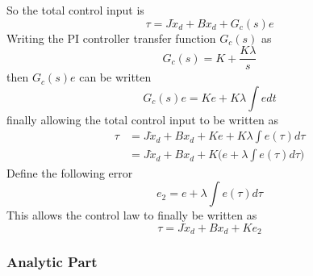 \noindent So the total control input is
\begin{equation*}
  \tau=J\dot{x}_{d}+Bx_{d}+G_{c}(s)e
\end{equation*}
Writing the PI controller transfer function $G_{c}(s)$ as
\begin{equation*}
  G_{c}(s)=K+\frac{K\lambda}{s}
\end{equation*}
then $G_{c}(s)e$ can be written
\begin{equation*}
  G_{c}(s)e=Ke+K\lambda\int edt
\end{equation*}
finally allowing the total control input to be written as
\begin{align*}
  \tau&=J\dot{x}_{d}+Bx_{d}+Ke+K\lambda\int e(\tau)d\tau \\
  &=J\dot{x}_{d}+Bx_{d}+K\biggr(e+\lambda\int e(\tau)d\tau\biggr)
\end{align*}
Define the following error
\begin{equation*}
  e_{2}=e+\lambda\int e(\tau)d\tau
\end{equation*}
This allows the control law to finally be written as
\begin{equation*}
  \tau=J\dot{x}_{d}+Bx_{d}+Ke_{2}
\end{equation*}

\subsubsection{Analytic Part}

